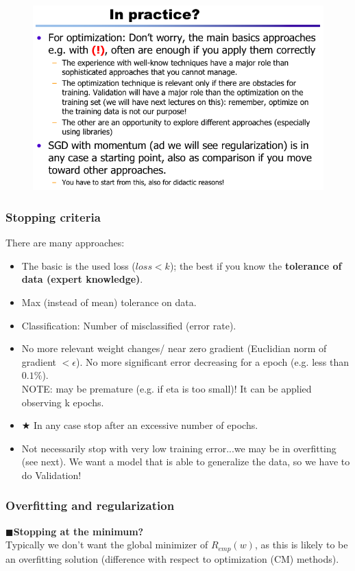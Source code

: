 \documentclass[../main.tex]{subfiles}
\begin{document}
\begin{figure}[H]
    \centering
    \includegraphics[scale = 0.36]{lectures/4_neural_networks/4_optimizers_4.png}
\end{figure}

\subsubsection{Stopping criteria}
There are many approaches:
\begin{itemize}
    \item The basic is the used loss ($loss<k$); the best if you know the \textbf{tolerance of data (expert knowledge)}.
    \item Max (instead of mean) tolerance on data.
    \item Classification: Number of misclassified (error rate).
    \item No more relevant weight changes/ near zero gradient (Euclidian norm of gradient $< \epsilon$). No more significant error decreasing for a epoch (e.g. less than $0.1\%$).\\
    NOTE: may be premature (e.g. if eta is too small)! It can be applied observing k epochs.
    \item $\bigstar$ In any case stop after an excessive number of epochs.
    \item Not necessarily stop with very low training error...we may be in overfitting (see next). We want a model that is able to generalize the data, so we have to do Validation!
\end{itemize}
\subsubsection{Overfitting and regularization}
$\blacksquare$\textbf{Stopping at the minimum?}\\
\noindent Typically we don’t want the global minimizer of $R_{emp}(w)$, as this is likely to be an overfitting solution (difference with respect to optimization (CM) methods).\\
\end{document}
